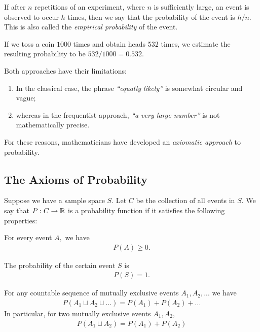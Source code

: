If after $n$ repetitions of an experiment, where $n$ is sufficiently large, an event is observed to occur $h$ times, then we say that the probability of the event is $h/n.$ This is also called the \emph{empirical probability} of the event.


\begin{example}
	\label{exmp:2.2.11}
	If we toss a coin $1000$ times and obtain heads 532 times, we estimate the resulting probability to be $532/1000=0.532$.
\end{example}



\begin{remark}
	Both approaches have their limitations:
	\begin{enumerate}
		\item In the classical case, the phrase \emph{``equally likely''} is somewhat circular and vague; 
		\item whereas in the frequentist approach, \emph{``a very large number''} is not mathematically precise. 
	\end{enumerate}
	For these reasons, mathematicians have developed an \emph{axiomatic approach} to probability.
\end{remark}


\subsection{The Axioms of Probability}

Suppose we have a sample space $S.$ Let $C$ be the collection of all events in $S.$ We say that $P:C \to \mathbb{R}$ is a probability function if it satisfies the following properties:

\begin{axiom}
	For every event $A,$ we have
	\begin{align}
		\label{eq:2.2.1}
		P(A)\geq 0.
	\end{align}
	
\end{axiom}



\begin{axiom}
	The probability of the certain event $S$ is
	\begin{align}
		\label{eq:2.2.2}
		P(S)=1.
	\end{align}
\end{axiom}



\begin{axiom}
	For any countable sequence of mutually exclusive events $A_{1},A_{2},...$ we have
	\begin{align}
		\label{eq:2.2.3}
		P(A_{1}\sqcup A_{2} \sqcup ...)=P(A_{1})+P(A_{2})+...
	\end{align}
	In particular, for two mutually exclusive events $A_{1},A_{2},$
	\begin{align}
		\label{eq:2.2.4}
		P(A_{1}\sqcup A_{2})=P(A_{1})+P(A_{2})
	\end{align}
	
\end{axiom}



